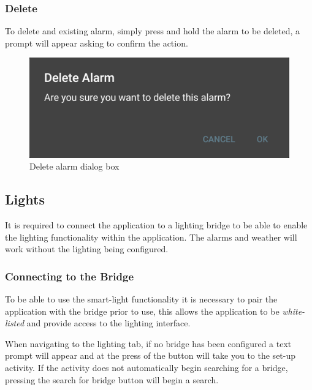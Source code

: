 \subsubsection{Delete}\label{delete}

To delete and existing alarm, simply press and hold the alarm to be
deleted, a prompt will appear asking to confirm the action.

\begin{figure}[H]
  \centering
  \includegraphics[scale=0.2]{Images/deleteAlarmDialog.png}
  \caption{Delete alarm dialog box}
  \label{fig:deleteAlarm}
\end{figure}

\subsection{Lights}\label{lights}

It is required to connect the application to a lighting bridge to be
able to enable the lighting functionality within the application. The
alarms and weather will work without the lighting being configured.

\subsubsection{Connecting to the Bridge}\label{connecting-to-the-bridge}

To be able to use the smart-light functionality it is necessary to pair
the application with the bridge prior to use, this allows the
application to be \emph{white-listed} and provide access to the lighting
interface.

When navigating to the lighting tab, if no bridge has been configured a
text prompt will appear and at the press of the button will take you to
the set-up activity. If the activity does not automatically begin
searching for a bridge, pressing the search for bridge button will begin
a search.

